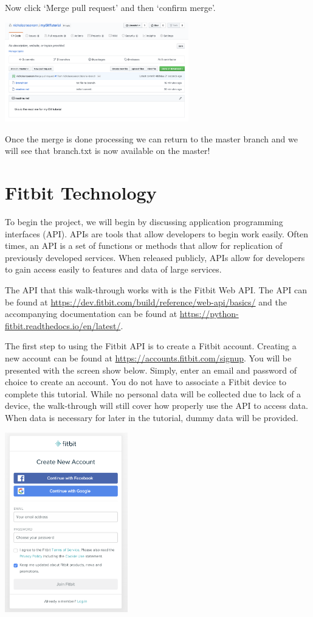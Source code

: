 \documentclass[]{book}
\begin{document}
Now click `Merge pull request' and then `confirm merge'.

\includegraphics[width=0.60000\textwidth]{images/final.png}

Once the merge is done processing we can return to the master branch and
we will see that branch.txt is now available on the master!

\chapter{Fitbit Technology}\label{fitbit-technology}

To begin the project, we will begin by discussing application
programming interfaces (API). APIs are tools that allow developers to
begin work easily. Often times, an API is a set of functions or methods
that allow for replication of previously developed services. When
released publicly, APIs allow for developers to gain access easily to
features and data of large services.

The API that this walk-through works with is the Fitbit Web API. The API
can be found at
\url{https://dev.fitbit.com/build/reference/web-api/basics/} and the
accompanying documentation can be found at
\url{https://python-fitbit.readthedocs.io/en/latest/}.

The first step to using the Fitbit API is to create a Fitbit account.
Creating a new account can be found at
\url{https://accounts.fitbit.com/signup}. You will be presented with the
screen show below. Simply, enter an email and password of choice to
create an account. You do not have to associate a Fitbit device to
complete this tutorial. While no personal data will be collected due to
lack of a device, the walk-through will still cover how properly use the
API to access data. When data is necessary for later in the tutorial,
dummy data will be provided.

\includegraphics[width=0.40000\textwidth]{images/fitbitAccount.png}
\end{document}
